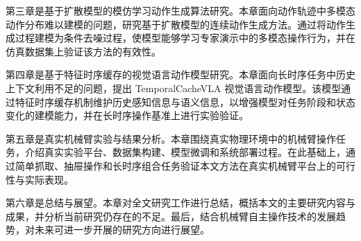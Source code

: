 第三章是基于扩散模型的模仿学习动作生成算法研究。本章面向动作轨迹中多模态动作分布难以建模的问题，研究基于扩散模型的连续动作生成方法。通过将动作生成过程建模为条件去噪过程，使模型能够学习专家演示中的多模态操作行为，并在仿真数据集上验证该方法的有效性。

第四章是基于特征时序缓存的视觉语言动作模型研究。本章面向长时序任务中历史上下文利用不足的问题，提出 TemporalCacheVLA 视觉语言动作模型。该模型通过特征时序缓存机制维护历史感知信息与语义信息，以增强模型对任务阶段和状态变化的建模能力，并在长时序操作基准上进行实验验证。

第五章是真实机械臂实验与结果分析。本章围绕真实物理环境中的机械臂操作任务，介绍真实实验平台、数据集构建、模型微调和系统部署过程。在此基础上，通过简单抓取、抽屉操作和长时序组合任务验证本文方法在真实机械臂平台上的可行性与实际表现。

第六章是总结与展望。本章对全文研究工作进行总结，概括本文的主要研究内容与成果，并分析当前研究仍存在的不足。最后，结合机械臂自主操作技术的发展趋势，对未来可进一步开展的研究方向进行展望。



